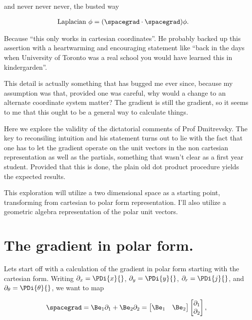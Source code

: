and never never never, the busted way

\begin{align}\label{eqn:divGradCurLap:3}
\text{Laplacian}\  \phi &= (\spacegrad \cdot \spacegrad) \phi.
\end{align}

Because ``this only works in cartesian coordinates''.  He probably backed up this assertion with a heartwarming and encouraging statement like ``back in the days when University of Toronto was a real school you would have learned this in kindergarden''.

This detail is actually something that has bugged me ever since, because my assumption was that, provided one was careful, why would a change to an alternate coordinate system matter?  The gradient is still the gradient, so it seems to me that this ought to be a general way to calculate things.

Here we explore the validity of the dictatorial comments of Prof Dmitrevsky.  The key to reconsiling intuition and his statement turns out to lie with the fact that one has to let the gradient operate on the unit vectors in the non cartesian representation as well as the partials, something that wasn't clear as a first year student.  Provided that this is done, the plain old dot product procedure yields the expected results.

This exploration will utilize a two dimensional space as a starting point, transforming from cartesian to polar form representation.  I'll also utilize a geometric algebra representation of the polar unit vectors.

\section{The gradient in polar form.}

Lets start off with a calculation of the gradient in polar form starting with the cartesian form.  Writing $\partial_x = \PDi{x}{}$, $\partial_y = \PDi{y}{}$, $\partial_r = \PDi{j}{}$, and $\partial_\theta = \PDi{\theta}{}$, we want to map

\begin{align}\label{eqn:divGradCurLap:4}
\spacegrad 
= \Be_1 \partial_1 + \Be_2 \partial_2
= 
\begin{bmatrix}
\Be_1 & \Be_2 
\end{bmatrix}
\begin{bmatrix}
\partial_1 \\
\partial_2 
\end{bmatrix},
\end{align}

